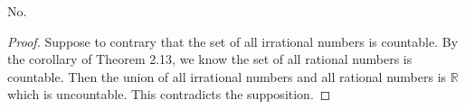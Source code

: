\begin{Exercise}
\begin{answer}
No. 
\end{answer}
\begin{proof}
Suppose to contrary that the set of all irrational numbers is countable. By the corollary of Theorem 2.13, we know the set of all rational numbers is countable. Then the union of all irrational numbers and all rational numbers is $\mathbb{R}$ which is uncountable. This contradicts the supposition.
\end{proof}
\end{Exercise}